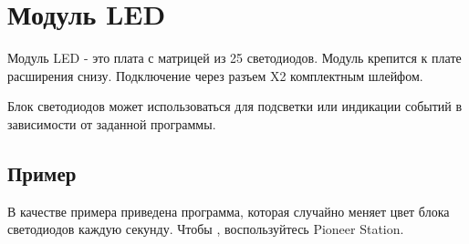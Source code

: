 \documentclass[a4paper,10pt,russian]{sphinxmanual}
\begin{document}
\section{Модуль LED}
\label{\detokenize{module/led:led}}\label{\detokenize{module/led::doc}}

Модуль LED - это плата с матрицей из 25 светодиодов. Модуль крепится к плате расширения снизу. Подключение через разъем X2 комплектным шлейфом.

Блок светодиодов может использоваться для подсветки или индикации событий в зависимости от заданной программы.


\subsection{Пример}
\label{\detokenize{module/led:id1}}
В качестве примера приведена программа, которая случайно меняет цвет блока светодиодов каждую секунду. Чтобы , воспользуйтесь Pioneer Station.
\end{document}
